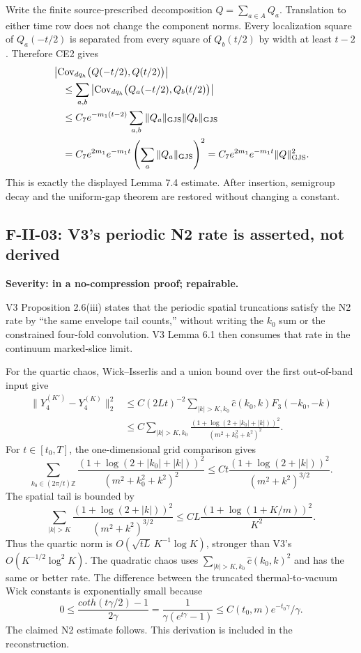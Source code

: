 \documentclass[11pt,a4paper]{article}
\begin{document}
Write the finite source-prescribed decomposition
$Q=\sum_{a\in A}Q_a$.  Translation to either time row does not change the component
norms.  Every localization square of $Q_a(-t/2)$ is separated from every square of
$Q_b(t/2)$ by width at least $t-2$.  Therefore CE2 gives
\begin{align*}
 &\left|\operatorname{Cov}_{dq_h}
 \bigl(Q(-t/2),Q(t/2)\bigr)\right|\\
 &\quad\le\sum_{a,b}\left|\operatorname{Cov}_{dq_h}
 \bigl(Q_a(-t/2),Q_b(t/2)\bigr)\right|\\
 &\quad\le C_7e^{-m_1(t-2)}
 \sum_{a,b}\|Q_a\|_{\rm GJS}\|Q_b\|_{\rm GJS}\\
 &\quad=C_7e^{2m_1}e^{-m_1t}
 \left(\sum_a\|Q_a\|_{\rm GJS}\right)^2
 =C_7e^{2m_1}e^{-m_1t}\|Q\|_{\rm GJS}^2.
\end{align*}
This is exactly the displayed Lemma 7.4 estimate.  After insertion, semigroup decay and
the uniform-gap theorem are restored without changing a constant.

\subsection{F-II-03: V3's periodic N2 rate is asserted, not derived}

\begin{finding}
\textbf{Severity: \Major in a no-compression proof; repairable.}

V3 Proposition 2.6(iii) states that the periodic spatial truncations satisfy the N2 rate
by ``the same envelope tail counts,'' without writing the $k_0$ sum or the constrained
four-fold convolution.  V3 Lemma 6.1 then consumes that rate in the continuum
marked-slice limit.
\end{finding}

For the quartic chaos, Wick--Isserlis and a union bound over the first out-of-band input
give
\begin{align*}
 \|Y_4^{(K')}-Y_4^{(K)}\|_2^2
 &\le C(2Lt)^{-2}\sum_{|k|>K,k_0}
 \widehat c(k_0,k)F_3(-k_0,-k)\\
 &\le C\sum_{|k|>K,k_0}
 \frac{(1+\log(2+|k_0|+|k|))^2}
 {(m^2+k_0^2+k^2)^2}.
\end{align*}
For $t\in[t_0,T]$, the one-dimensional grid comparison gives
\[
 \sum_{k_0\in(2\pi/t)\mathbb Z}
 \frac{(1+\log(2+|k_0|+|k|))^2}{(m^2+k_0^2+k^2)^2}
 \le Ct\frac{(1+\log(2+|k|))^2}{(m^2+k^2)^{3/2}}.
\]
The spatial tail is bounded by
\[
 \sum_{|k|>K}\frac{(1+\log(2+|k|))^2}{(m^2+k^2)^{3/2}}
 \le CL\frac{(1+\log(1+K/m))^2}{K^2}.
\]
Thus the quartic norm is $O(\sqrt{tL}\,K^{-1}\log K)$, stronger than V3's
$O(K^{-1/2}\log^2K)$.  The quadratic chaos uses
$\sum_{|k|>K,k_0}\widehat c(k_0,k)^2$ and has the same or better rate.  The difference
between the truncated thermal-to-vacuum Wick constants is exponentially small because
\[
 0\le\frac{coth(t\gamma/2)-1}{2\gamma}
 =\frac{1}{\gamma(e^{t\gamma}-1)}\le C(t_0,m)e^{-t_0\gamma}/\gamma.
\]
The claimed N2 estimate follows.  This derivation is included in the reconstruction.
\end{document}
